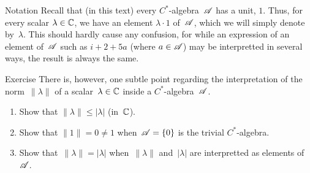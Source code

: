 \documentclass[main]{subfiles}
\begin{document}
\begin{parsec}%
\begin{point}{Notation}%
Recall that (in this text) every $C^*$-algebra~$\mathscr{A}$ has a unit, $1$.
Thus, for every scalar $\lambda\in \mathbb{C}$,
we have an element $\lambda\cdot 1$ of~$\mathscr{A}$,
which we will simply denote by~$\lambda$.
This should hardly cause any confusion,
for while an expression of an element of~$\mathscr{A}$
such as $i+2+5a$ (where $a\in \mathscr{A}$) 
may be interpretted in several ways,
the result is always the same.
\end{point}
\begin{point}{Exercise}%
There is, however, one subtle point regarding
the interpretation
of the norm~$\|\lambda\|$ of a
scalar~$\lambda\in \mathbb{C}$ inside a $C^*$-algebra~$\mathscr{A}$.
\begin{enumerate}
\item 
Show that $\|\lambda\|\leq \left| \lambda\right|$ (in~$\mathbb{C}$).
\item
Show that $\|1\|=0\neq 1$ when~$\mathscr{A}=\{0\}$ is the trivial $C^*$-algebra.
\item
Show that~$\|\lambda\|=\left|\lambda\right|$
when~$\|\lambda\|$ and~$\left|\lambda\right|$
are interpretted as elements of~$\mathscr{A}$.
\end{enumerate}
\end{point}
\end{parsec}
\end{document}

